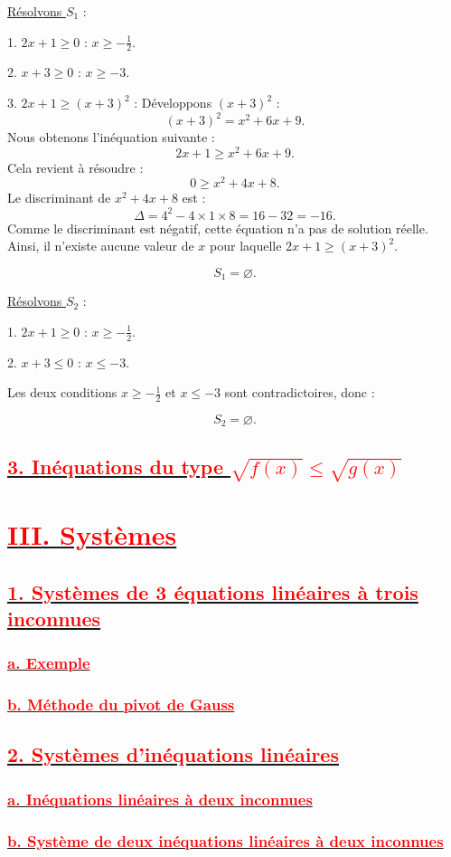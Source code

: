 \documentclass[12pt]{article}
\newcounter{solution}
\begin{document}
\underline{Résolvons \( S_1 \)} :

1. \( 2x + 1 \geq 0 \) :  
   \( x \geq -\frac{1}{2} \).

2. \( x + 3 \geq 0 \) :  
   \( x \geq -3 \).

3. \( 2x + 1 \geq (x + 3)^2 \) :  
   Développons \( (x + 3)^2 \) :  
   \[
   (x + 3)^2 = x^2 + 6x + 9.
   \]
   Nous obtenons l'inéquation suivante :  
   \[
   2x + 1 \geq x^2 + 6x + 9.
   \]
   Cela revient à résoudre :
   \[
   0 \geq x^2 + 4x + 8.
   \]
   Le discriminant de \( x^2 + 4x + 8 \) est :
   \[
   \Delta = 4^2 - 4 \times 1 \times 8 = 16 - 32 = -16.
   \]
   Comme le discriminant est négatif, cette équation n'a pas de solution réelle. Ainsi, il n'existe aucune valeur de \( x \) pour laquelle \( 2x + 1 \geq (x + 3)^2 \).

\[
S_1 = \varnothing.
\]

\underline{Résolvons \( S_2 \)} :

1. \( 2x + 1 \geq 0 \) :  
   \( x \geq -\frac{1}{2} \).

2. \( x + 3 \leq 0 \) :  
   \( x \leq -3 \).

Les deux conditions \( x \geq -\frac{1}{2} \) et \( x \leq -3 \) sont contradictoires, donc :

\[
S_2 = \varnothing.
\]

\subsection*{\underline{\textbf{\textcolor{red}{3. Inéquations du type \( \sqrt{f(x)} \leq  \sqrt{g(x)} \) }}}}

\section*{\underline{\textbf{\textcolor{red}{III. Systèmes}}}}
\subsection*{\underline{\textbf{\textcolor{red}{1. Systèmes de 3 équations linéaires à trois inconnues}}}}
\subsubsection*{\underline{\textbf{\textcolor{red}{a. Exemple}}}}
\subsubsection*{\underline{\textbf{\textcolor{red}{b. Méthode du pivot de Gauss }}}}
\subsection*{\underline{\textbf{\textcolor{red}{2. Systèmes d’inéquations linéaires }}}}
\subsubsection*{\underline{\textbf{\textcolor{red}{a. Inéquations linéaires à deux inconnues}}}}
\subsubsection*{\underline{\textbf{\textcolor{red}{b. Système de deux inéquations linéaires à deux inconnues }}}}
\end{document}
